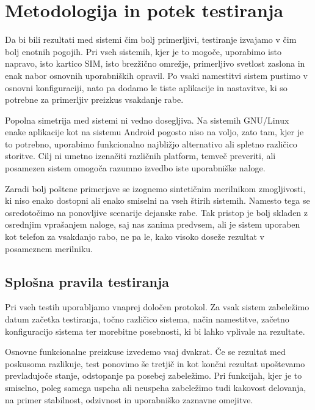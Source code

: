 \documentclass[a4paper,12pt,openright]{book}
\begin{document}
\section{Metodologija in potek testiranja}
\label{sec:metodologija_in_potek}

Da bi bili rezultati med sistemi čim bolj primerljivi, testiranje izvajamo v čim bolj enotnih pogojih.
Pri vseh sistemih, kjer je to mogoče, uporabimo isto napravo, isto kartico SIM, isto brezžično omrežje, primerljivo svetlost zaslona in enak nabor osnovnih uporabniških opravil.
Po vsaki namestitvi sistem pustimo v osnovni konfiguraciji, nato pa dodamo le tiste aplikacije in nastavitve, ki so potrebne za primerljiv preizkus vsakdanje rabe.

Popolna simetrija med sistemi ni vedno dosegljiva.
Na sistemih GNU/Linux enake aplikacije kot na sistemu Android pogosto niso na voljo, zato tam, kjer je to potrebno, uporabimo funkcionalno najbližjo alternativo ali spletno različico storitve.
Cilj ni umetno izenačiti različnih platform, temveč preveriti, ali posamezen sistem omogoča razumno izvedbo iste uporabniške naloge.

Zaradi bolj poštene primerjave se izognemo sintetičnim merilnikom zmogljivosti, ki niso enako dostopni ali enako smiselni na vseh štirih sistemih.
Namesto tega se osredotočimo na ponovljive scenarije dejanske rabe.
Tak pristop je bolj skladen z osrednjim vprašanjem naloge, saj nas zanima predvsem, ali je sistem uporaben kot telefon za vsakdanjo rabo, ne pa le, kako visoko doseže rezultat v posameznem merilniku.

\subsection{Splošna pravila testiranja}
\label{subsec:splosna_pravila_testiranja}

Pri vseh testih uporabljamo vnaprej določen protokol.
Za vsak sistem zabeležimo datum začetka testiranja, točno različico sistema, način namestitve, začetno konfiguracijo sistema ter morebitne posebnosti, ki bi lahko vplivale na rezultate.

Osnovne funkcionalne preizkuse izvedemo vsaj dvakrat.
Če se rezultat med poskusoma razlikuje, test ponovimo še tretjič in kot končni rezultat upoštevamo prevladujoče stanje, odstopanje pa posebej zabeležimo.
Pri funkcijah, kjer je to smiselno, poleg samega uspeha ali neuspeha zabeležimo tudi kakovost delovanja, na primer stabilnost, odzivnost in uporabniško zaznavne omejitve.
\end{document}
